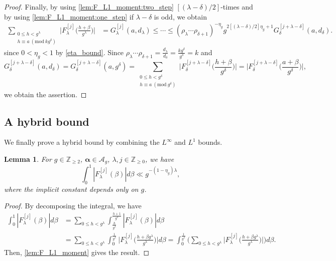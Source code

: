 \documentclass[hidelinks]{amsart}
\numberwithin{equation}{section}
\theoremstyle{plain}
\newtheorem{lemma}{Lemma}
\theoremstyle{definition}
\renewcommand{\mod}[1]{(\mathrm{mod}\ #1)}
\begin{document}
\begin{proof}
Finally, by using \cref{lem:F_L1_moment:two_step} $[(\lambda-\delta)/2]$-times
and by using \cref{lem:F_L1_moment:one_step} if $\lambda-\delta$ is odd, we obtain
\begin{align}
\sum_{\substack{
0\le h<g^{\lambda}\\
h\equiv a\ \mod{kg^{\delta}}
}}
\biggl|F_{\lambda}^{[j]}\biggl(\frac{h+\beta}{g^{\lambda}}\biggr)\biggr|
&=
G_{\lambda}^{[j]}(a,d_{\lambda})
\le
\cdots
\le
(\rho_{\lambda}\cdots\rho_{\delta+1})^{-\eta_{g}}
g^{2[(\lambda-\delta)/2]\eta_{g}+1}
G_{\delta}^{[j+\lambda-\delta]}(a,d_{\delta}).
\end{align}
since $0<\eta_{g}<1$ by \cref{eta_bound}.
Since
$\rho_{\lambda}\cdots\rho_{\delta+1}
=
\frac{d_{\lambda}}{d_{\delta}}
=
\frac{kg^{\delta}}{g^{\delta}}
=
k$
and
\[
G_{\delta}^{[j+\lambda-\delta]}(a,d_{\delta})
=
G_{\delta}^{[j+\lambda-\delta]}(a,g^{\delta})
=
\sum_{\substack{
0\le h<g^{\delta}\\
h\equiv a\ \mod{g^{\delta}}
}}
\biggl|
F_{\delta}^{[j+\lambda-\delta]}\biggl(\frac{h+\beta}{g^{\delta}}\biggr)
\biggr|
=
\biggl|
F_{\delta}^{[j+\lambda-\delta]}\biggl(\frac{a+\beta}{g^{\delta}}\biggr)
\biggr|,
\]
we obtain the assertion.
\end{proof}

\subsection{A hybrid bound}
\label{subsec:large_sieve}
We finally prove a hybrid bound by combining the $L^{\infty}$ and $L^{1}$ bounds.

\begin{lemma}
\label{lem:continous_L1}
For $g\in\mathbb{Z}_{\ge2}$, $\bm{\alpha}\in\mathscr{A}_{g}$, $\lambda,j\in\mathbb{Z}_{\ge0}$, we have
\[
\int_{0}^{1}
|F_{\lambda}^{[j]}(\beta)|d\beta
\ll
g^{-(1-\eta_{g})\lambda},
\]
where the implicit constant depends only on $g$.
\end{lemma}
\begin{proof}
By decomposing the integral, we have
\begin{align}
\int_{0}^{1}
|F_{\lambda}^{[j]}(\beta)|d\beta
&=
\sum_{0\le h<g^{\lambda}}
\int_{\frac{h}{g^{\lambda}}}^{\frac{h+1}{g^{\lambda}}}
|F_{\lambda}^{[j]}(\beta)|d\beta\\
&=
\sum_{0\le h<g^{\lambda}}
\int_{0}^{\frac{1}{g^{\lambda}}}
\biggl|F_{\lambda}^{[j]}\biggl(\frac{h+\beta g^{\lambda}}{g^{\lambda}}\biggr)\biggr|d\beta
=
\int_{0}^{\frac{1}{g^{\lambda}}}
\biggl(
\sum_{0\le h<g^{\lambda}}
\biggl|F_{\lambda}^{[j]}\biggl(\frac{h+\beta g^{\lambda}}{g^{\lambda}}\biggr)\biggr|
\biggr)d\beta.
\end{align}
Then, \cref{lem:F_L1_moment} gives the result.
\end{proof}
\end{document}
